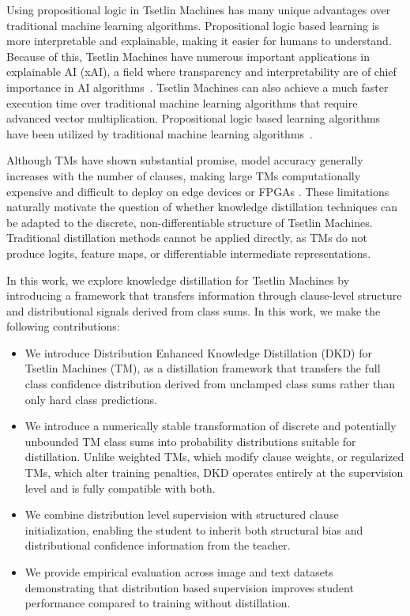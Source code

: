 \documentclass[sn-mathphys-num]{sn-jnl}%
\theoremstyle{thmstyleone}%
\theoremstyle{thmstyletwo}%
\theoremstyle{thmstylethree}%
\begin{document}
Using propositional logic in Tsetlin Machines has many unique advantages over traditional machine learning algorithms. Propositional logic based learning is more interpretable and explainable, making it easier for humans to understand. Because of this, Tsetlin Machines have numerous important applications in explainable AI (xAI), a field where transparency and interpretability are of chief importance in AI algorithms~\cite{xu2019explainable,dovsilovic2018explainable}. Tsetlin Machines can also achieve a much faster execution time over traditional machine learning algorithms that require advanced vector multiplication. Propositional logic based learning algorithms have been utilized by traditional machine learning algorithms~\cite{anjum2022localization, anjumlocalization}.

Although TMs have shown substantial promise, model accuracy generally increases with the number of clauses, making large TMs computationally expensive and difficult to deploy on edge devices or FPGAs \cite{zhang2021low}. These limitations naturally motivate the question of whether knowledge distillation techniques can be adapted to the discrete, non-differentiable structure of Tsetlin Machines. Traditional distillation methods cannot be applied directly, as TMs do not produce logits, feature maps, or differentiable intermediate representations.

In this work, we explore knowledge distillation for Tsetlin Machines by introducing a framework that transfers information through clause-level structure and distributional signals derived from class sums. In this work, we make the following contributions:
\begin{itemize}
	\item We introduce Distribution Enhanced Knowledge Distillation (DKD) for Tsetlin Machines (TM), as a distillation framework that transfers the full class confidence distribution derived from unclamped class sums rather than only hard class predictions.
	\item We introduce a numerically stable transformation of discrete and potentially unbounded TM class sums into probability distributions suitable for distillation. Unlike weighted TMs, which modify clause weights, or regularized TMs, which alter training penalties, DKD operates entirely at the supervision level and is fully compatible with both.
	\item We combine distribution level supervision with structured clause initialization, enabling the student to inherit both structural bias and distributional confidence information from the teacher.
	\item We provide empirical evaluation across image and text datasets demonstrating that distribution based supervision improves student performance compared to training without distillation.
\end{itemize}
\end{document}

